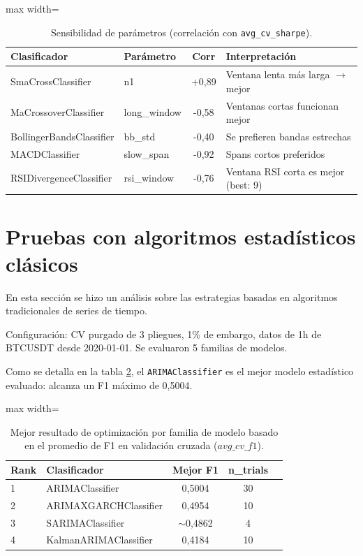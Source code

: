 \begin{table}[H]
    \centering
    \caption[Sensibilidad de Parámetros]{Sensibilidad de parámetros (correlación con \texttt{avg\_cv\_sharpe}).}
    \small
    \begin{adjustbox}{max width=\textwidth}
    \begin{tabular}{l l c p{5.5cm}}
        \toprule
        \textbf{Clasificador} & \textbf{Parámetro} & \textbf{Corr} & \textbf{Interpretación} \\
        \midrule
        SmaCrossClassifier       & n1 & +0,89 & Ventana lenta más larga $\rightarrow$ mejor \\
        MaCrossoverClassifier    & long\_window & -0,58 & Ventanas cortas funcionan mejor \\
        BollingerBandsClassifier & bb\_std & -0,40 & Se prefieren bandas estrechas \\
        MACDClassifier           & slow\_span & -0,92 & Spans cortos preferidos \\
        RSIDivergenceClassifier  & rsi\_window & -0,76 & Ventana RSI corta es mejor (best: 9) \\
        \bottomrule
    \end{tabular}
    \end{adjustbox}
    \label{tab:sensibilidad}
\end{table}


\section{Pruebas con algoritmos estadísticos clásicos}
En esta sección se hizo un análisis sobre las estrategias basadas en algoritmos tradicionales de series de tiempo.

Configuración: CV purgado de 3 pliegues, 1\% de embargo, datos de 1h de BTCUSDT desde 2020-01-01. Se evaluaron 5 familias de modelos.

Como se detalla en la tabla \ref{tab:mejores_modelos}, el \texttt{ARIMAClassifier} es el mejor modelo estadístico evaluado: alcanza un F1 máximo de 0,5004. 

\begin{table}[H]
  \centering
  \caption[Resultados de Optimización]{Mejor resultado de optimización por familia de modelo basado en el promedio de F1 en validación cruzada ($avg\_cv\_f1$).}
  \small
  \begin{adjustbox}{max width=\textwidth}
  \begin{tabular}{l l c c l}
    \toprule
    \textbf{Rank} & \textbf{Clasificador} & \textbf{Mejor F1} & \textbf{n\_trials}\\
    \midrule
    1 & ARIMAClassifier        & 0,5004 & 30  \\
    2 & ARIMAXGARCHClassifier  & 0,4954 & 10  \\
    3 & SARIMAClassifier       & $\sim$0,4862 & 4 \\
    4 & KalmanARIMAClassifier  & 0,4184 & 10  \\
    \bottomrule
  \end{tabular}
  \end{adjustbox}
  \label{tab:mejores_modelos}
\end{table}

